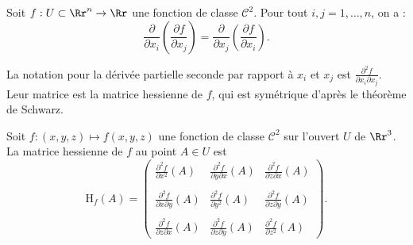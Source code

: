 \documentclass[12pt, class=report,crop=false]{standalone}
\begin{document}
\vskip6mm

\begin{theoreme}Soit $f:U\subset \Rr^n\to \Rr$ une fonction de classe ${\mathscr C}^2$. Pour tout $i,j=1,\dots ,n$, on a :
$$\frac{\partial}{\partial x_i}\left(\frac{\partial f}{\partial x_j}\right)=\frac{\partial}{\partial x_j}\left(\frac{\partial f}{\partial x_i}\right).$$
\end{theoreme}

\vskip4mm

\noindent La notation pour la dérivée partielle seconde par rapport à $x_i$ et $x_j$ est $\displaystyle \frac{\partial ^2f}{\partial x_i\partial x_j}$. Leur matrice est la matrice hessienne de $f$, qui est symétrique d'après le théorème de Schwarz.

\vskip6mm

\begin{definition}Soit $f:(x,y,z)\mapsto f(x,y,z)$ une fonction de classe $\mathscr{C}^2$ sur l'ouvert $U$ de $\Rr^3$. La matrice hessienne de $f$ au point $A\in U$ est
$$\mbox{H}_f(A)=\left(\begin{array}{ccc}\displaystyle \frac{\partial ^2f}{\partial x^2}(A)&\displaystyle \frac{\partial ^2f}{\partial y\partial x}(A)&\displaystyle \frac{\partial ^2f}{\partial z\partial x}(A)\\ \\ \displaystyle \frac{\partial ^2f}{\partial x\partial y}(A)&\displaystyle \frac{\partial ^2f}{\partial y^2}(A)&\displaystyle \frac{\partial ^2f}{\partial z\partial y}(A)\\ \\ \displaystyle \frac{\partial ^2f}{\partial z\partial x}(A)&\displaystyle \frac{\partial ^2f}{\partial z\partial y}(A)&\displaystyle \frac{\partial ^2f}{\partial z^2}(A)\end{array}\right).$$
\end{definition}

\vskip6mm
\end{document}
